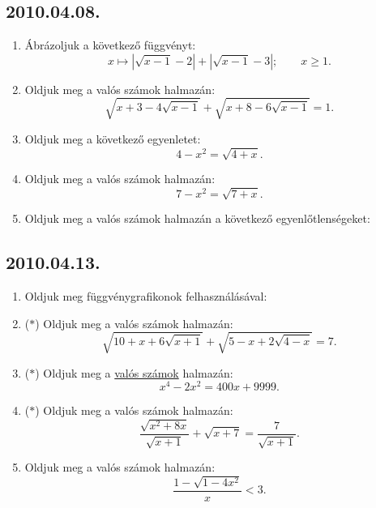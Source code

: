 \subsection*{2010.04.08.}
\begin{enumerate}
\item Ábrázoljuk a következő függvényt:
$$x\mapsto |\sqrt{x-1}-2|+|\sqrt{x-1}-3|;\qquad x\ge 1.$$
\item Oldjuk meg a valós számok halmazán:
$$\sqrt{x+3-4\sqrt{x-1}}+\sqrt{x+8-6\sqrt{x-1}}=1.$$
\item Oldjuk meg a következő egyenletet:
$$4-x^2=\sqrt{4+x}.$$
\item Oldjuk meg a valós számok halmazán:
$$7-x^2=\sqrt{7+x}.$$
\item Oldjuk meg a valós számok halmazán a következő egyenlőtlenségeket:
\end{enumerate}

\subsection*{2010.04.13.}
\begin{enumerate}
\item Oldjuk meg függvénygrafikonok felhasználásával:
\item ($*$) Oldjuk meg a valós számok halmazán:
$$\sqrt{10+x+6\sqrt{x+1}}+\sqrt{5-x+2\sqrt{4-x}}=7.$$
\item ($*$) Oldjuk meg a \underline{valós számok} halmazán:
$$x^4-2x^2=400x+9999.$$
\item ($*$) Oldjuk meg a valós számok halmazán:
$$\dfrac{\sqrt{x^2+8x}}{\sqrt{x+1}}+\sqrt{x+7}=\dfrac{7}{\sqrt{x+1}}.$$
\item Oldjuk meg a valós számok halmazán:
$$\dfrac{1-\sqrt{1-4x^2}}{x}<3.$$
\end{enumerate}
